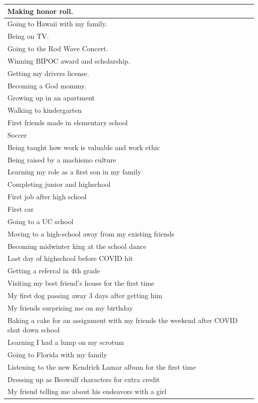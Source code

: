 \documentclass[
  .7em,
  letterpaper,
  DIV=11,
  numbers=noendperiod]{scrartcl}
\begin{document}
\begin{table}
\begin{tabular}{l}
Making honor roll.\\
\hline
Going to Hawaii with my family.\\
\hline
Being on TV.\\
\hline
Going to the Rod Wave Concert.\\
\hline
Winning BIPOC award and scholarship.\\
\hline
Getting my drivers license.\\
\hline
Becoming a God mommy.\\
\hline
Growing up in an apartment\\
\hline
Walking to kindergarten\\
\hline
First friends made in elementary school\\
\hline
Soccer\\
\hline
Being taught how work is valuable and work ethic\\
\hline
Being raised by a machismo culture\\
\hline
Learning my role as a first son in my family\\
\hline
Completing junior and highschool\\
\hline
First job after high school\\
\hline
First car\\
\hline
Going to a UC school\\
\hline
Moving to a high-school away from my existing friends\\
\hline
Becoming midwinter king at the school dance\\
\hline
Last day of highschool before COVID hit\\
\hline
Getting a referral in 4th grade\\
\hline
Visiting my best friend's house for the first time\\
\hline
My first dog passing away 3 days after getting him\\
\hline
My friends surprising me on my birthday\\
\hline
Baking a cake for an assignment with my friends the weekend after COVID shut down school\\
\hline
Learning I had a lump on my scrotum\\
\hline
Going to Florida with my family\\
\hline
Listening to the new Kendrick Lamar album for the first time\\
\hline
Dressing up as Beowulf characters for extra credit\\
\hline
My friend telling me about his endeavors with a girl\\

\end{tabular}
\end{table}
\end{document}
